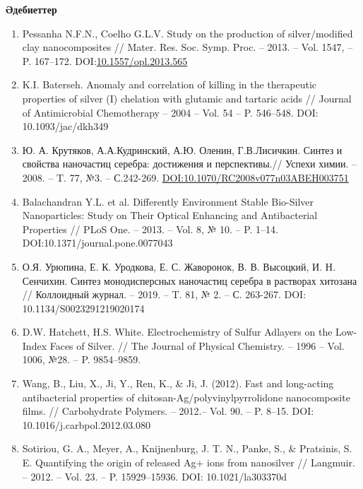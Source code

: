 \begin{center}
{\bfseries Әдебиеттер}
\end{center}

\begin{references}
\begin{enumerate}
\def\labelenumi{\arabic{enumi}.}
\item
  Pessanha N.F.N., Coelho G.L.V. Study on the production of
  silver/modified clay nanocomposites // Mater. Res. Soc. Symp. Proc. --
  2013. -- Vol. 1547, -- P. 167--172.
  DOI:\href{http://dx.doi.org/10.1557/opl.2013.565}{10.1557/opl.2013.565}
\item
  K.I. Baterseh. Anomaly and correlation of killing in the therapeutic
  properties of silver (I) chelation with glutamic and tartaric acids //
  Journal of Antimicrobial Chemotherapy -- 2004 -- Vol. 54 -- P.
  546--548. DOI: 10.1093/jac/dkh349
\item
  Ю. А. Крутяков, А.А.Кудринский, А.Ю. Оленин, Г.В.Лисичкин. Синтез и
  свойства наночастиц серебра: достижения и перспективы.// Успехи химии.
  -- 2008. -- T. 77, №3. -- С.242-269.
  \href{https://doi.org/10.1070/RC2008v077n03ABEH003751}{DOI:10.1070/RC2008v077n03ABEH003751}
\item
  Balachandran Y.L. et al. Differently Environment Stable Bio-Silver
  Nanoparticles: Study on Their Optical Enhancing and Antibacterial
  Properties // PLoS One. -- 2013. -- Vol. 8, № 10. -- P. 1--14.
  DOI:10.1371/journal.pone.0077043
\item
  О.Я. Урюпина, Е. К. Уродкова, Е. С. Жаворонок, В. В. Высоцкий, И. Н.
  Сенчихин. Синтез монодисперсных наночастиц серебра в растворах
  хитозана // Коллоидный журнал. -- 2019. -- T. 81, № 2. -- С. 263-267.
  DOI: 10.1134/S0023291219020174
\item
  D.W. Hatchett, H.S. White. Electrochemistry of Sulfur Adlayers on the
  Low-Index Faces of Silver. // The Journal of Physical Chemistry. --
  1996 -- Vol. 1006, №28. -- P. 9854--9859.
\item
  Wang, B., Liu, X., Ji, Y., Ren, K., \& Ji, J. (2012). Fast and
  long-acting antibacterial properties of
  chitosan-Ag/polyvinylpyrrolidone nanocomposite films. // Carbohydrate
  Polymers. -- 2012.-- Vol. 90. -- P. 8--15. DOI:
  10.1016/j.carbpol.2012.03.080
\item
  Sotiriou, G. A., Meyer, A., Knijnenburg, J. T. N., Panke, S., \&
  Pratsinis, S. E. Quantifying the origin of released Ag+ ions from
  nanosilver // Langmuir. -- 2012. -- Vol. 23. -- P. 15929--15936. DOI:
  10.1021/la303370d

\end{enumerate}
\end{references}
